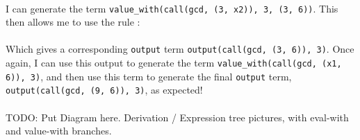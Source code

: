 
\mbox{} \\
I can generate the term \lstinline{value_with(call(gcd, (3, x2)), 3, (3, 6))}. This then allows me to use the rule : \\%


\mbox{} \\
Which gives a corresponding \lstinline{output} term \lstinline{output(call(gcd, (3, 6)), 3)}. Once again, I can use this output to generate the term \lstinline{value_with(call(gcd, (x1, 6)), 3)}, and then use this term to generate the final \lstinline{output} term, \lstinline{output(call(gcd, (9, 6)), 3)}, as expected! \\ \\%
TODO: Put Diagram here. Derivation / Expression tree pictures, with eval-with and value-with branches.

\pagebreak
%
%